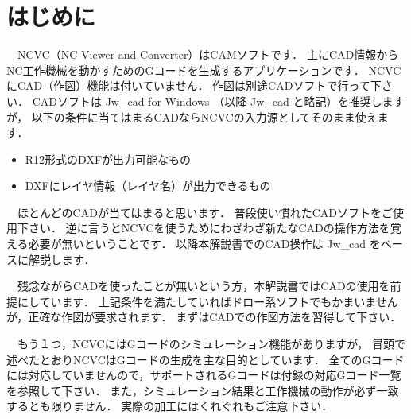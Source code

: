 
\section{はじめに}
　NCVC（NC Viewer and Converter）はCAMソフトです．
主にCAD情報からNC工作機械を動かすためのGコードを生成するアプリケーションです．
NCVCにCAD（作図）機能は付いていません．
作図は別途CADソフトで行って下さい．
CADソフトは Jw\_cad for Windows （以降 Jw\_cad と略記）を推奨しますが，
以下の条件に当てはまるCADならNCVCの入力源としてそのまま使えます．

\begin{itemize}
    \item R12形式のDXFが出力可能なもの
    \item DXFにレイヤ情報（レイヤ名）が出力できるもの
\end{itemize}

　ほとんどのCADが当てはまると思います．
普段使い慣れたCADソフトをご使用下さい．
逆に言うとNCVCを使うためにわざわざ新たなCADの操作方法を覚える必要が無いということです．
以降本解説書でのCAD操作は Jw\_cad をベースに解説します．

　残念ながらCADを使ったことが無いという方，本解説書ではCADの使用を前提にしています．
上記条件を満たしていればドロー系ソフトでもかまいませんが，正確な作図が要求されます．
まずはCADでの作図方法を習得して下さい．

　もう１つ，NCVCにはGコードのシミュレーション機能がありますが，
冒頭で述べたとおりNCVCはGコードの生成を主な目的としています．
全てのGコードには対応していませんので，サポートされるGコードは付録の対応Gコード一覧を参照して下さい．
また，シミュレーション結果と工作機械の動作が必ず一致するとも限りません．
実際の加工にはくれぐれもご注意下さい．
